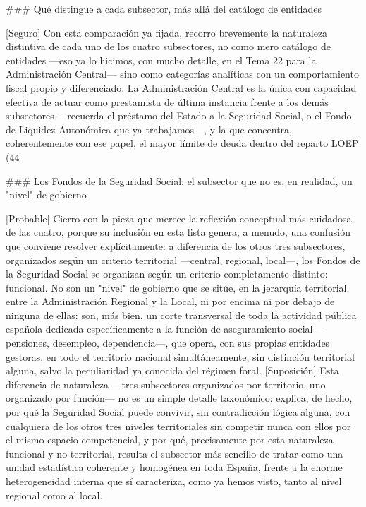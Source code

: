 \documentclass[10pt,a4paper]{article}
\begin{document}
### Qué distingue a cada subsector, más allá del catálogo de entidades

[Seguro] Con esta comparación ya fijada, recorro brevemente la naturaleza distintiva de cada uno de los cuatro subsectores, no como mero catálogo de entidades —eso ya lo hicimos, con mucho detalle, en el Tema 22 para la Administración Central— sino como categorías analíticas con un comportamiento fiscal propio y diferenciado. La Administración Central es la única con capacidad efectiva de actuar como prestamista de última instancia frente a los demás subsectores —recuerda el préstamo del Estado a la Seguridad Social, o el Fondo de Liquidez Autonómica que ya trabajamos—, y la que concentra, coherentemente con ese papel, el mayor límite de deuda dentro del reparto LOEP (44%

### Los Fondos de la Seguridad Social: el subsector que no es, en realidad, un "nivel" de gobierno

[Probable] Cierro con la pieza que merece la reflexión conceptual más cuidadosa de las cuatro, porque su inclusión en esta lista genera, a menudo, una confusión que conviene resolver explícitamente: a diferencia de los otros tres subsectores, organizados según un criterio territorial —central, regional, local—, los Fondos de la Seguridad Social se organizan según un criterio completamente distinto: funcional. No son un "nivel" de gobierno que se sitúe, en la jerarquía territorial, entre la Administración Regional y la Local, ni por encima ni por debajo de ninguna de ellas: son, más bien, un corte transversal de toda la actividad pública española dedicada específicamente a la función de aseguramiento social —pensiones, desempleo, dependencia—, que opera, con sus propias entidades gestoras, en todo el territorio nacional simultáneamente, sin distinción territorial alguna, salvo la peculiaridad ya conocida del régimen foral. [Suposición] Esta diferencia de naturaleza —tres subsectores organizados por territorio, uno organizado por función— no es un simple detalle taxonómico: explica, de hecho, por qué la Seguridad Social puede convivir, sin contradicción lógica alguna, con cualquiera de los otros tres niveles territoriales sin competir nunca con ellos por el mismo espacio competencial, y por qué, precisamente por esta naturaleza funcional y no territorial, resulta el subsector más sencillo de tratar como una unidad estadística coherente y homogénea en toda España, frente a la enorme heterogeneidad interna que sí caracteriza, como ya hemos visto, tanto al nivel regional como al local.
\end{document}
